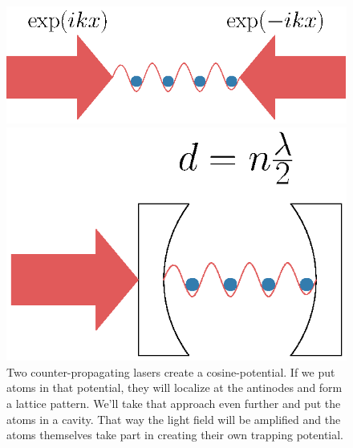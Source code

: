 \begin{figure}[!htb]
	\begin{minipage}[b]{.5\linewidth}
	\centering
	\includegraphics[width=.7\linewidth]{images/counter_propagating.eps}
	\end{minipage}
%
	\begin{minipage}[b]{.5\linewidth}
	\centering
	\includegraphics[width=.7\linewidth]{images/cavity.eps}
	\end{minipage}
\caption{Two counter-propagating lasers create a cosine-potential. If we put atoms in that potential, they will localize at the antinodes and form a lattice pattern. We'll take that approach even further and put the atoms in a cavity. That way the light field will be amplified and the atoms themselves take part in creating their own trapping potential.}
\label{laser_cavity}
\end{figure}
\FloatBarrier

